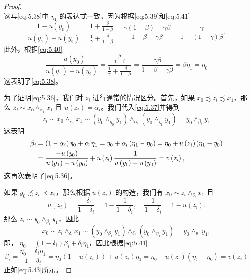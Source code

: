 \begin{proof}
\[\]
这与\eqref{eq:5.38}中 \({\eta }_{1}\) 的表达式一致，因为根据\eqref{eq:5.39}和\eqref{eq:5.41}
\[
\frac{1 - u\left( {y}_{0}\right) }{u\left( {y}_{1}\right)  - u\left( {y}_{0}\right) } = \frac{1 + \frac{\beta }{1 - \beta }}{\frac{1}{\gamma } + \frac{\beta }{1 - \beta }} = \frac{\gamma \left( {1 - \beta }\right)  + {\gamma \beta }}{1 - \beta  + {\gamma \beta }} = \frac{\gamma }{1 - \left( {1 - \gamma }\right) \beta }.
\]
此外，根据\eqref{eq:5.40}
\[
\frac{-u\left( {y}_{0}\right) }{u\left( {y}_{1}\right)  - u\left( {y}_{0}\right) } = \frac{\frac{\beta }{1 - \beta }}{\frac{1}{\gamma } + \frac{\beta }{1 - \beta }} = \frac{\gamma \beta }{1 - \beta  + {\gamma \beta }} = \beta {\eta }_{1} = {\eta }_{0}
\]
这表明了\eqref{eq:5.38}。

为了证明\eqref{eq:5.36}，我们对 \({z}_{i}\) 进行通常的情况区分。首先，如果 \({x}_{0} \precsim  {z}_{i} \precsim  {x}_{1}\)，那么 \({z}_{i} \sim  {x}_{0}{ \land  }_{{\alpha }_{i}}{x}_{1}\) 且 \(u\left( {z}_{i}\right)  = {\alpha }_{i}\)。我们代入\eqref{eq:5.37}并得到
\[
{z}_{i} \sim  {x}_{0}{ \land  }_{{\alpha }_{i}}{x}_{1} \sim  \left( {{y}_{0}{ \land  }_{{\eta }_{0}}{y}_{1}}\right) { \land  }_{{\alpha }_{i}}\left( {{y}_{0}{ \land  }_{{\eta }_{1}}{y}_{1}}\right)  = {y}_{0}{ \land  }_{{\beta }_{i}}{y}_{1}
\]
这表明
\begin{align}
{\beta }_{i} &= \left( {1 - {\alpha }_{i}}\right) {\eta }_{0} + {\alpha }_{i}{\eta }_{1} = {\eta }_{0} + {\alpha }_{i}\left( {{\eta }_{1} - {\eta }_{0}}\right)  = {\eta }_{0} + u\left( {z}_{i}\right) \left( {{\eta }_{1} - {\eta }_{0}}\right) \notag \\
&= \frac{-u\left( {y}_{0}\right) }{u\left( {y}_{1}\right)  - u\left( {y}_{0}\right) } + u\left( {z}_{i}\right) \frac{1}{u\left( {y}_{1}\right)  - u\left( {y}_{0}\right) } = v\left( {z}_{i}\right),\label{eq:5.43}
\end{align}
这再次表明了\eqref{eq:5.36}。

如果 \({y}_{0} \precsim  {z}_{i} \prec  {x}_{0}\)，那么根据 \(u\left( {z}_{i}\right)\) 的构造，我们有 \({x}_{0} \sim  {z}_{i}{ \land  }_{{\delta }_{i}}{x}_{1}\) 且
\begin{equation}
\label{eq:5.44}
u\left( {z}_{i}\right)  = \frac{-{\delta }_{i}}{1 - {\delta }_{i}} = 1 - \frac{1}{1 - {\delta }_{i}}, ~~~~~\frac{1}{1 - {\delta }_{i}} = 1 - u\left( {z}_{i}\right) .
\end{equation}
那么 \({z}_{i} \sim  {y}_{0}{ \land  }_{{\beta }_{i}}{y}_{1}\)，因此
\[
{x}_{0} \sim  {z}_{i}{ \land  }_{{\delta }_{i}}{x}_{1} \sim  \left( {{y}_{0}{ \land  }_{{\beta }_{i}}{y}_{1}}\right) { \land  }_{{\delta }_{i}}\left( {{y}_{0}{ \land  }_{{\eta }_{1}}{y}_{1}}\right)  = {y}_{0}{ \land  }_{{\eta }_{0}}{y}_{1},
\]
即， \({\eta }_{0} = \left( {1 - {\delta }_{i}}\right) {\beta }_{i} + {\delta }_{i}{\eta }_{1}\)，因此根据\eqref{eq:5.44}
\[
{\beta }_{i} = \frac{{\eta }_{0} - {\delta }_{i}{\eta }_{1}}{1 - {\delta }_{i}} = {\eta }_{0}\left( {1 - u\left( {z}_{i}\right) }\right)  + u\left( {z}_{i}\right) {\eta }_{1} = {\eta }_{0} + u\left( {z}_{i}\right) \left( {{\eta }_{1} - {\eta }_{0}}\right)  = v\left( {z}_{i}\right)
\]
正如\eqref{eq:5.43}所示。


\end{proof}
